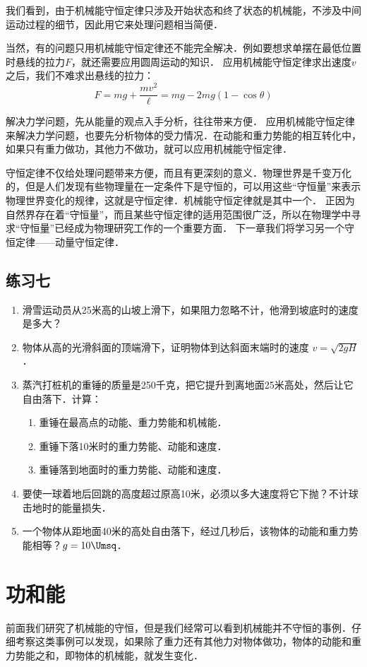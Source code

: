 我们看到，由于机械能守恒定律只涉及开始状态和终了状态的机械能，不涉及中间运动过程的细节，因此用它来处理问题相当简便．

当然，有的问题只用机械能守恒定律还不能完全解决．例如要想求单摆在最低位置时悬线的拉力$F$，就还需要应用圆周运动的知识．
应用机械能守恒定律求出速度$v$之后，我们不难求出悬线的拉力：
\[F=mg+\frac{mv^2}{\ell}=mg-2mg (1-\cos\theta)\]

解决力学问题，先从能量的观点入手分析，往往带来方便．
应用机械能守恒定律来解决力学问题，也要先分析物体的受力情况．在动能和重力势能的相互转化中，如果只有重力做功，其他力不做功，就可以应用机械能守恒定律．

守恒定律不仅给处理问题带来方便，而且有更深刻的意义．物理世界是千变万化的，但是人们发现有些物理量在一定条件下是守恒的，可以用这些“守恒量”来表示物理世界变化的规律，这就是守恒定律．机械能守恒定律就是其中一个．
正因为自然界存在着“守恒量”，而且某些守恒定律的适用范围很广泛，所以在物理学中寻求“守恒量”已经成为物理研究工作的一个重要方面．
下一章我们将学习另一个守恒定律——动量守恒定律．

\subsection*{练习七}
\begin{enumerate}
    \item 滑雪运动员从25米高的山坡上滑下，如果阻力忽略不计，他滑到坡底时的速度是多大？
    \item 物体从高的光滑斜面的顶端滑下，证明物体到达斜面末端时的速度 $v=\sqrt{2gH}$．
    \item 蒸汽打桩机的重锤的质量是250千克，把它提升到离地面25米高处，然后让它自由落下．计算：
    \begin{enumerate}
        \item 重锤在最高点的动能、重力势能和机械能．
        \item 重锤下落10米时的重力势能、动能和速度．
        \item 重锤落到地面时的重力势能、动能和速度．
    \end{enumerate}
\item 要使一球着地后回跳的高度超过原高10米，必须以多大速度将它下抛？不计球击地时的能量损失．
\item 一个物体从距地面40米的高处自由落下，经过几秒后，该物体的动能和重力势能相等？$g=10\Umsq$．
\end{enumerate}

\section{功和能}\label{sec-A-07-work-and-energy}
前面我们研究了机械能的守恒，但是我们经常可以看到机械能并不守恒的事例．仔细考察这类事例可以发现，如果除了重力还有其他力对物体做功，物体的动能和重力势能之和，即物体的机械能，就发生变化．

